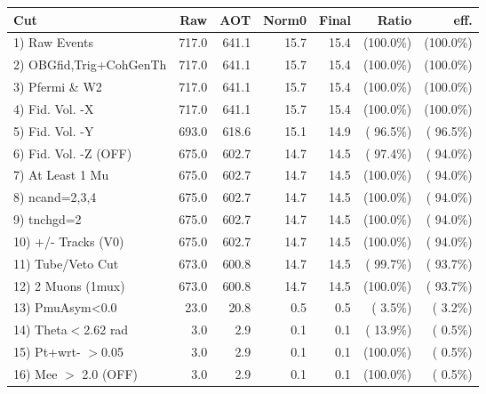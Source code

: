  \begin{table}[h!]\centering
 \begin{tabular}{||l||r|r|r|r|r|r||}
 \hline
 \hline
 Cut & Raw & AOT & Norm0 & Final & Ratio & eff.       \\
 \hline
  1) Raw Events           &        717.0 &        641.1 &         15.7 &         15.4 & (100.0\%) & (100.0\%) \\
  2) OBGfid,Trig+CohGenTh &        717.0 &        641.1 &         15.7 &         15.4 & (100.0\%) & (100.0\%) \\
  3) Pfermi \& W2         &        717.0 &        641.1 &         15.7 &         15.4 & (100.0\%) & (100.0\%) \\
  4) Fid. Vol. -X         &        717.0 &        641.1 &         15.7 &         15.4 & (100.0\%) & (100.0\%) \\
  5) Fid. Vol. -Y         &        693.0 &        618.6 &         15.1 &         14.9 & ( 96.5\%) & ( 96.5\%) \\
  6) Fid. Vol. -Z (OFF)   &        675.0 &        602.7 &         14.7 &         14.5 & ( 97.4\%) & ( 94.0\%) \\
  7) At Least 1 Mu        &        675.0 &        602.7 &         14.7 &         14.5 & (100.0\%) & ( 94.0\%) \\
  8) ncand=2,3,4          &        675.0 &        602.7 &         14.7 &         14.5 & (100.0\%) & ( 94.0\%) \\
  9) tnchgd=2             &        675.0 &        602.7 &         14.7 &         14.5 & (100.0\%) & ( 94.0\%) \\
 10) +/- Tracks (V0)      &        675.0 &        602.7 &         14.7 &         14.5 & (100.0\%) & ( 94.0\%) \\
 11) Tube/Veto Cut        &        673.0 &        600.8 &         14.7 &         14.5 & ( 99.7\%) & ( 93.7\%) \\
 12) 2 Muons (1mux)       &        673.0 &        600.8 &         14.7 &         14.5 & (100.0\%) & ( 93.7\%) \\
 13) PmuAsym<0.0          &         23.0 &         20.8 &          0.5 &          0.5 & (  3.5\%) & (  3.2\%) \\
 14) Theta$<$2.62 rad     &          3.0 &          2.9 &          0.1 &          0.1 & ( 13.9\%) & (  0.5\%) \\
 15) Pt+wrt- $>$0.05      &          3.0 &          2.9 &          0.1 &          0.1 & (100.0\%) & (  0.5\%) \\
 16) Mee $>$ 2.0  (OFF)   &          3.0 &          2.9 &          0.1 &          0.1 & (100.0\%) & (  0.5\%) \\

\end{tabular}
\end{table}
